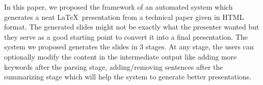 In this paper, we proposed the framework of an automated system which generates
a neat \LaTeX\ presentation from a technical paper given in HTML format. The generated
slides might not be exactly what the presenter wanted but they serve as a good starting
point to convert it into a final presentation. The system we proposed generates the slides
in 3 stages. At any stage, the users can optionally modify the content in the intermediate output like adding more keywords after the parsing stage, adding/removing sentences after
the summarizing stage which will help the system to generate better presentations.